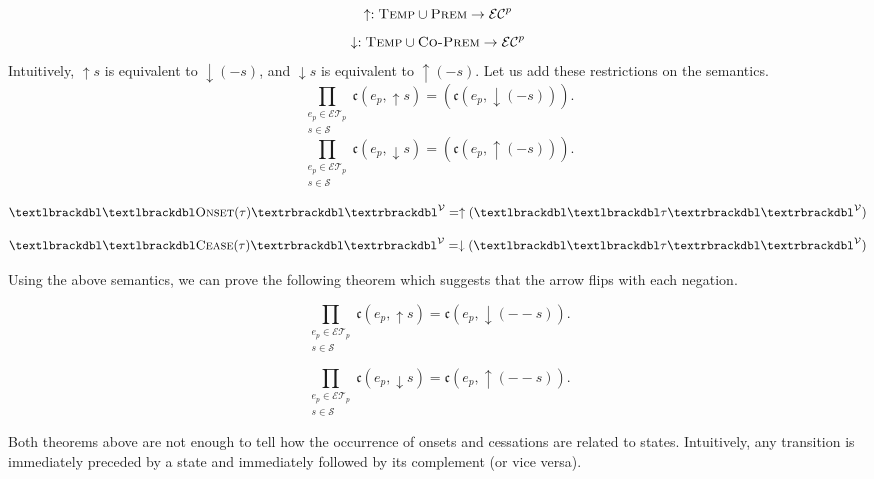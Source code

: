 $$\uparrow :  \textsc{Temp} \cup \textsc{Prem} \to \mathcal{EC}^p$$
$$\downarrow :  \textsc{Temp} \cup \textsc{Co-Prem} \to \mathcal{EC}^p$$
Intuitively, $\uparrow s$ is equivalent to $\downarrow(-s)$, and $\downarrow s$ is equivalent to $\uparrow(-s)$. Let us add these restrictions on the semantics.
\begin{equation}
    \prod_{\substack{e_p \in \mathcal{ET}_p \\ s \in \mathcal{S}}} \mathfrak{c}(e_p, \uparrow s) = (\mathfrak{c}(e_p, \downarrow(- s))).
\end{equation}
\begin{equation}\label{ax:cessation}
    \prod_{\substack{e_p \in \mathcal{ET}_p \\ s \in \mathcal{S}}}\mathfrak{c}(e_p, \downarrow s) = (\mathfrak{c}(e_p, \uparrow(- s))).
\end{equation}

\[
    \textlbrackdbl\textlbrackdbl \textsc{Onset}(\tau) \textrbrackdbl \textrbrackdbl^{\mathcal{V}}
    = \uparrow(\textlbrackdbl \textlbrackdbl\tau \textrbrackdbl\textrbrackdbl^{\mathcal{V}})
\]

\[
    \textlbrackdbl\textlbrackdbl \textsc{Cease}(\tau) \textrbrackdbl\textrbrackdbl^{\mathcal{V}}
    = \downarrow(\textlbrackdbl \textlbrackdbl\tau \textrbrackdbl\textrbrackdbl^{\mathcal{V}})
\]


Using the above semantics, we can prove the following theorem which suggests that the arrow flips with each negation.

\begin{theorem}\label{thm:arrow_flip}
    \begin{equation}
       \prod_{\substack{e_p \in \mathcal{ET}_p \\ s \in \mathcal{S}}} \mathfrak{c}(e_p, \uparrow s) = \mathfrak{c}(e_p, \downarrow (-- s)).
    \end{equation}
\end{theorem}
\begin{theorem}
    \begin{equation}
        \prod_{\substack{e_p \in \mathcal{ET}_p \\ s \in \mathcal{S}}}\mathfrak{c}(e_p, \downarrow s) = \mathfrak{c}(e_p, \uparrow (-- s)).
    \end{equation}
\end{theorem}

Both theorems above are not enough to tell how the occurrence of onsets and cessations are related to states.
Intuitively, any
transition is immediately preceded by a state and immediately followed by its complement (or vice versa).

